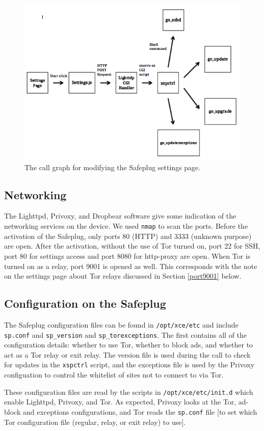 \documentclass[conference]{IEEEtran}
\begin{document}
\begin{figure}
\centering
\includegraphics[width=.55\textwidth]{new_callgraph}
\caption{The call graph for modifying the Safeplug settings page.}
\label{fig:callgraph}
\end{figure} 

\subsection{Networking}
The Lighttpd, Privoxy, and Dropbear software give some indication of the networking services on the device.  We used \texttt{nmap} to scan the ports.  Before the activation of the Safeplug, only ports 80 (HTTP) and 3333 (unknown purpose) are open.  After the activation, without the use of Tor turned on, port 22 for SSH, port 80 for settings access and port 8080 for http-proxy are open.  When Tor is turned on as a relay, port 9001 is opened as well.  This corresponds with the note on the settings page about Tor relays discussed in Section \ref{port9001} below.
    
\subsection{Configuration on the Safeplug}
\label{spconfig}
The Safeplug configuration files can be found in \verb!/opt/xce/etc! and include \verb!sp.conf! and \verb!sp_version! and \verb!sp_torexceptions!.  The first contains all of the configuration details: whether to use Tor, whether to block ads, and whether to act as a Tor relay or exit relay. The version file is used during the call to check for updates in the \verb!xspctrl! script, and the exceptions file is used by the Privoxy configuation to control the whitelist of sites not to connect to via Tor.

These configuration files are read by the scripts in \verb!/opt/xce/etc/init.d! which enable Lighttpd, Privoxy, and Tor.  As expected, Privoxy looks at the Tor, ad-block and exceptions configurations, and Tor reads the \verb!sp.conf! file [to set which Tor configuration file (regular, relay, or exit relay) to use].
\end{document}
